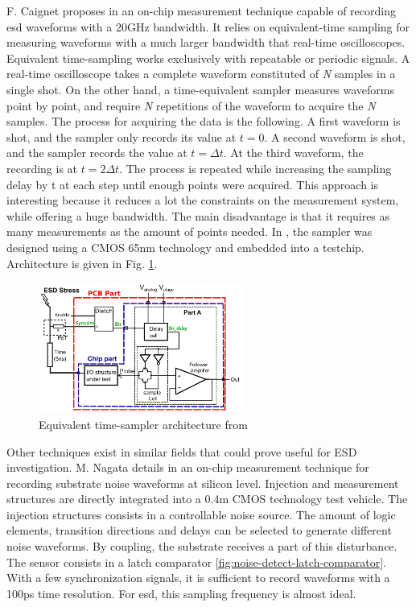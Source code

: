 F. Caignet proposes in \cite{eq-time-sampling} an on-chip measurement technique capable of recording \gls{esd} waveforms with a 20GHz bandwidth.
It relies on equivalent-time sampling for measuring waveforms with a much larger bandwidth that real-time oscilloscopes.
Equivalent time-sampling works exclusively with repeatable or periodic signals.
A real-time oscilloscope takes a complete waveform constituted of \textit{N} samples in a single shot.
On the other hand, a time-equivalent sampler measures waveforms point by point, and require \textit{N} repetitions of the waveform to acquire the \textit{N} samples.
The process for acquiring the data is the following.
A first waveform is shot, and the sampler only records its value at $t=0$.
A second waveform is shot, and the sampler records the value at $t=\Delta t$.
At the third waveform, the recording is at $t=2\Delta t$.
The process is repeated while increasing the sampling delay by \textDelta{}t at each step until enough points were acquired.
This approach is interesting because it reduces a lot the constraints on the measurement system, while offering a huge bandwidth.
The main disadvantage is that it requires as many measurements as the amount of points needed.
In \cite{eq-time-sampling}, the sampler was designed using a CMOS 65nm technology and embedded into a testchip.
Architecture is given in Fig. \ref{fig:eq-time-sampler-architecture}.

\begin{figure}[!h]
  \centering
  \includegraphics[width=0.6\textwidth]{src/1/figures/architecture_equivalent_time_sampler.png}
  \caption{Equivalent time-sampler architecture from \cite{eq-time-sampling}}
  \label{fig:eq-time-sampler-architecture}
\end{figure}

Other techniques exist in similar fields that could prove useful for ESD investigation.
M. Nagata details in \cite{substrate-noise-measurement} an on-chip measurement technique for recording substrate noise waveforms at silicon level.
Injection and measurement structures are directly integrated into a 0.4\textmu{}m CMOS technology test vehicle.
The injection structures consists in a controllable noise source.
The amount of logic elements, transition directions and delays can be selected to generate different noise waveforms.
By coupling, the substrate receives a part of this disturbance.
The sensor consists in a latch comparator \ref{fig:noise-detect-latch-comparator}.
With a few synchronization signals, it is sufficient to record waveforms with a 100ps time resolution.
For \gls{esd}, this sampling frequency is almost ideal.

